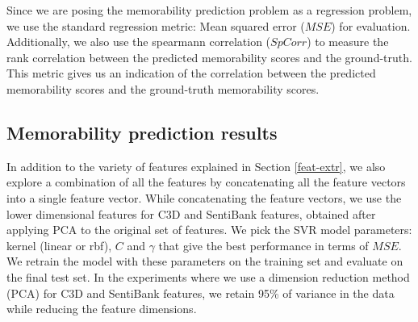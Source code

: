 \documentclass[sigconf]{acmart}
\begin{document}
Since we are posing the memorability prediction problem as a regression problem, we use the standard regression metric: Mean squared error ($MSE$) for evaluation.
Additionally, we also use the spearmann correlation ($SpCorr$) to measure the rank correlation between the predicted memorability scores and the ground-truth.
This metric gives us an indication of the correlation between the predicted memorability scores and the ground-truth memorability scores.

\subsection{Memorability prediction results}
\label{pred-res}
In addition to the variety of features explained in Section \ref{feat-extr}, we also explore a combination of all the features by concatenating all the feature vectors into a single feature vector.
While concatenating the feature vectors, we use the lower dimensional features for C3D and SentiBank features, obtained after applying PCA to the original set of features.
We pick the SVR model parameters: kernel (linear or rbf), $C$ and $\gamma$ that give the best performance in terms of $MSE$.
We retrain the model with these parameters on the training set and evaluate on the final test set.
In the experiments where we use a dimension reduction method (PCA) for C3D and SentiBank features, we retain 95\% of variance in the data while reducing the feature dimensions. 
\end{document}
